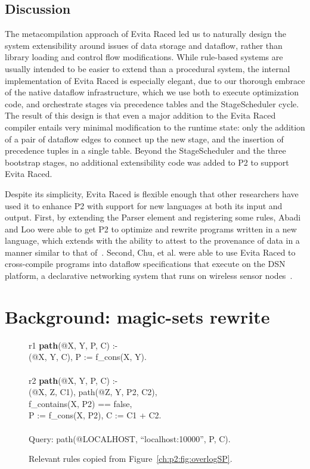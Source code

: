\subsection{Discussion}

The metacompilation approach of Evita Raced led us to naturally design the
system extensibility around issues of data storage and dataflow, rather than
library loading and control flow modifications.  While rule-based systems are
usually intended to be easier to extend than a procedural system, the internal
implementation of Evita Raced is especially elegant, due to our thorough
embrace of the native dataflow infrastructure, which we use both to execute
optimization code, and orchestrate stages via precedence tables and the
StageScheduler cycle.  The result of this design is that even a major addition
to the Evita Raced compiler entails very minimal modification to the runtime
state: only the addition of a pair of dataflow edges to connect up the new
stage, and the insertion of precedence tuples in a single table.  Beyond the
StageScheduler and the three bootstrap stages, no additional extensibility code
was added to P2 to support Evita Raced.

Despite its simplicity, Evita Raced is flexible enough that other researchers
have used it to enhance P2 with support for new languages at both its input and
output.  First, by extending the Parser element and registering some \OVERLOG
rules, Abadi and Loo were able to get P2 to optimize and rewrite programs
written in a new language, which extends \OVERLOG with the ability to attest to
the provenance of data in a manner similar to that of~\cite{abadi-netdb07}.
Second, Chu, et al. were able to use Evita Raced to cross-compile \OVERLOG programs
into dataflow specifications that execute on the DSN platform, a declarative
networking system that runs on wireless sensor nodes~\cite{chu-sensys07}.

\section{Background: magic-sets rewrite}

\label{ch:evita:sec:magic}
\begin{figure}[!t]
\ssp
\centering
\begin{boxedminipage}{\linewidth}
r1 {\bf path}(@X, Y, P, C) :- \\
(@X, Y, C), P := f\_cons(X, Y). \\
\\
r2 {\bf path}(@X, Y, P, C) :- \\
(@X, Z, C1), path(@Z, Y, P2, C2),\\
\datalogspace f\_contains(X, P2) == false, \\
\datalogspace P := f\_cons(X, P2), C := C1 + C2. \\
\\
Query: path(@LOCALHOST, ``localhost:10000'', P, C).
\end{boxedminipage}
\caption{\label{ch:evita:fig:querySP}Relevant rules copied from Figure~\ref{ch:p2:fig:overlogSP}.}
\end{figure}

